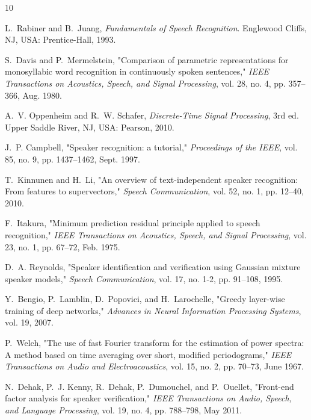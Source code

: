\begin{thebibliography}{10}

L.~Rabiner and B.~Juang, \emph{Fundamentals of Speech Recognition}. Englewood Cliffs, NJ, USA: Prentice-Hall, 1993.

S.~Davis and P.~Mermelstein, "Comparison of parametric representations for monosyllabic word recognition in continuously spoken sentences," \emph{IEEE Transactions on Acoustics, Speech, and Signal Processing}, vol. 28, no. 4, pp. 357--366, Aug. 1980.

A.~V. Oppenheim and R.~W. Schafer, \emph{Discrete-Time Signal Processing}, 3rd ed. Upper Saddle River, NJ, USA: Pearson, 2010.

J.~P. Campbell, "Speaker recognition: a tutorial," \emph{Proceedings of the IEEE}, vol. 85, no. 9, pp. 1437--1462, Sept. 1997.

T.~Kinnunen and H.~Li, "An overview of text-independent speaker recognition: From features to supervectors," \emph{Speech Communication}, vol. 52, no. 1, pp. 12--40, 2010.

F.~Itakura, "Minimum prediction residual principle applied to speech recognition," \emph{IEEE Transactions on Acoustics, Speech, and Signal Processing}, vol. 23, no. 1, pp. 67--72, Feb. 1975.

D.~A. Reynolds, "Speaker identification and verification using Gaussian mixture speaker models," \emph{Speech Communication}, vol. 17, no. 1-2, pp. 91--108, 1995.

Y.~Bengio, P.~Lamblin, D.~Popovici, and H.~Larochelle, "Greedy layer-wise training of deep networks," \emph{Advances in Neural Information Processing Systems}, vol. 19, 2007.

P.~Welch, "The use of fast Fourier transform for the estimation of power spectra: A method based on time averaging over short, modified periodograms," \emph{IEEE Transactions on Audio and Electroacoustics}, vol. 15, no. 2, pp. 70--73, June 1967.

N.~Dehak, P.~J. Kenny, R.~Dehak, P.~Dumouchel, and P.~Ouellet, "Front-end factor analysis for speaker verification," \emph{IEEE Transactions on Audio, Speech, and Language Processing}, vol. 19, no. 4, pp. 788--798, May 2011.

\end{thebibliography}